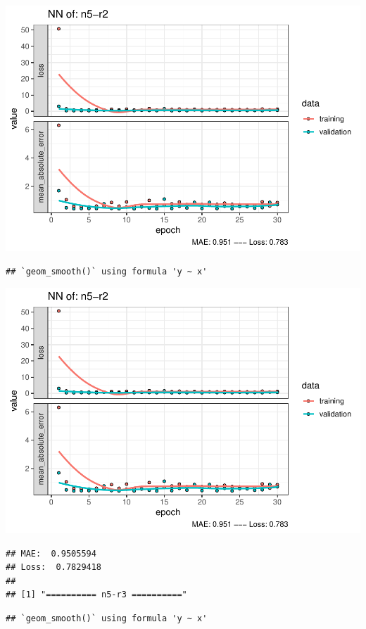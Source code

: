 \documentclass[
]{article}
\begin{document}
\includegraphics{project-code_files/figure-latex/unnamed-chunk-18-37.pdf}

\begin{verbatim}
## `geom_smooth()` using formula 'y ~ x'
\end{verbatim}

\includegraphics{project-code_files/figure-latex/unnamed-chunk-18-38.pdf}

\begin{verbatim}
## MAE:  0.9505594
## Loss:  0.7829418 
## 
## [1] "========== n5-r3 =========="
\end{verbatim}

\begin{verbatim}
## `geom_smooth()` using formula 'y ~ x'
\end{verbatim}
\end{document}
